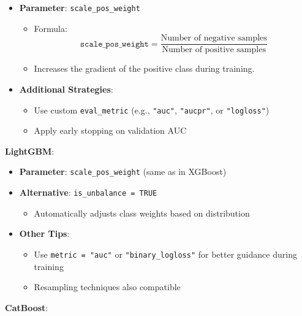 \documentclass[
  letterpaper,
  DIV=11,
  numbers=noendperiod]{scrreprt}
\providecommand{\tightlist}{%
  \setlength{\itemsep}{0pt}\setlength{\parskip}{0pt}}\usepackage{longtable,booktabs,array}
\begin{document}
\begin{itemize}
\tightlist
\item
  \textbf{Parameter}: \texttt{scale\_pos\_weight}

  \begin{itemize}
  \tightlist
  \item
    Formula:\\
    \[
    \texttt{scale\_pos\_weight} = \frac{\text{Number of negative samples}}{\text{Number of positive samples}}
    \]
  \item
    Increases the gradient of the positive class during training.
  \end{itemize}
\item
  \textbf{Additional Strategies}:

  \begin{itemize}
  \tightlist
  \item
    Use custom \texttt{eval\_metric} (e.g., \texttt{"auc"},
    \texttt{"aucpr"}, or \texttt{"logloss"})
  \item
    Apply early stopping on validation AUC
  \end{itemize}
\end{itemize}

\textbf{LightGBM}:

\begin{itemize}
\tightlist
\item
  \textbf{Parameter}: \texttt{scale\_pos\_weight} (same as in XGBoost)
\item
  \textbf{Alternative}: \texttt{is\_unbalance\ =\ TRUE}

  \begin{itemize}
  \tightlist
  \item
    Automatically adjusts class weights based on distribution
  \end{itemize}
\item
  \textbf{Other Tips}:

  \begin{itemize}
  \tightlist
  \item
    Use \texttt{metric\ =\ "auc"} or \texttt{"binary\_logloss"} for
    better guidance during training
  \item
    Resampling techniques also compatible
  \end{itemize}
\end{itemize}

\textbf{CatBoost}:
\end{document}
